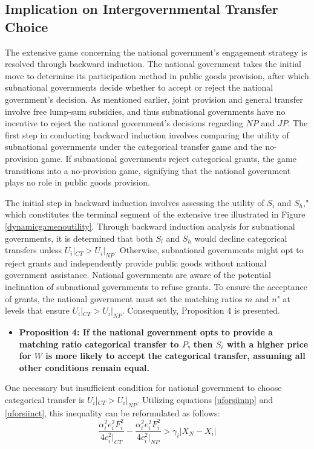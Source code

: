 \subsection{Implication on Intergovernmental Transfer Choice}

The extensive game concerning the national government's engagement strategy is resolved through backward induction. The national government takes the initial move to determine its participation method in public goods provision, after which subnational governments decide whether to accept or reject the national government's decision. As mentioned earlier, joint provision and general transfer involve free lump-sum subsidies, and thus subnational governments have no incentive to reject the national government's decisions regarding $NP$ and $JP$. The first step in conducting backward induction involves comparing the utility of subnational governments under the categorical transfer game and the no-provision game. If subnational governments reject categorical grants, the game transitions into a no-provision game, signifying that the national government plays no role in public goods provision.

The initial step in backward induction involves assessing the utility of $S_i$ and $S_h$," which constitutes the terminal segment of the extensive tree illustrated in Figure \ref{dynamicgamenoutility}. Through backward induction analysis for subnational governments, it is determined that both $S_l$ and $S_h$ would decline categorical transfers unless $U_i|_{CT}>U_i|_{NP}$. Otherwise, subnational governments might opt to reject grants and independently provide public goods without national government assistance. National governments are aware of the potential inclination of subnational governments to refuse grants. To ensure the acceptance of grants, the national government must set the matching ratios $m$ and $n$" at levels that ensure $U_i|_{CT} > U_i|_{NP}$. Consequently, Proposition 4 is presented.%

\begin {itemize}
\item \textbf{Proposition 4: If the national government opts to provide a matching ratio categorical transfer to $P$, then $S_i$ with a higher price for $W$ is more likely to accept the categorical transfer, assuming all other conditions remain equal.}
\end{itemize}

One necessary but insufficient condition for national government to choose categorical transfer is $U_i|_{CT} > U_i|_{NP}$. Utilizing equations \ref{uforsiinnp} and \ref{uforsiinct}, this inequality can be reformulated as follows:
\begin{equation}
    \frac{\alpha_i^2 e_i^2 F_i^2}{4c_i^2|_{CT}}-\frac{\alpha_i^2 e_i^2 F_i^2}{4c_i^2|_{NP}} > \gamma_i|X_N-X_i| \label{ctunpu}
\end{equation}

